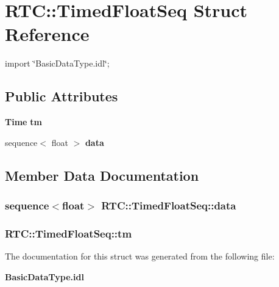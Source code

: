 \section{RTC::TimedFloatSeq Struct Reference}
\label{structRTC_1_1TimedFloatSeq}


{\ttfamily import \char`\"{}BasicDataType.idl\char`\"{};}

\subsection*{Public Attributes}
\begin{DoxyCompactItemize}
\item 
{\bf Time} {\bf tm}
\item 
sequence$<$ float $>$ {\bf data}
\end{DoxyCompactItemize}


\subsection{Member Data Documentation}
\subsubsection[{data}]{\setlength{\rightskip}{0pt plus 5cm}sequence$<$float$>$ {\bf RTC::TimedFloatSeq::data}}\label{structRTC_1_1TimedFloatSeq_a797fd0ae3021d0cc9eaccdc2f12b3ad4}
\subsubsection[{tm}]{ {\bf RTC::TimedFloatSeq::tm}}\label{structRTC_1_1TimedFloatSeq_a9edda8052def84ee7da46c49c9c0bf69}


The documentation for this struct was generated from the following file:\begin{DoxyCompactItemize}
\item 
{\bf BasicDataType.idl}\end{DoxyCompactItemize}
